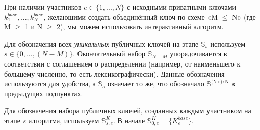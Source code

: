 При наличии участников $e \in \{1,...,N\}$ с исходными приватными ключами $k^{base}_1,...,k^{base}_N$, желающими создать объединённый ключ по схеме «M $\leq$ N» (где M $\geq$ 1 и N $\geq$ 2), мы можем использовать интерактивный алгоритм.

Для обозначения всех {\em уникальных} публичных ключей на этапе $\mathbb{S}_s$ используем $s \in \{0,...,(N-M)\}$. Окончательный набор $\mathbb{S}_{N-M}$ упорядочивается в соответствии с соглашением о распреде\-лении (например, от наименьшего к большему численно, то есть лексикографически). Данные обозначения используются для удобства, а $\mathbb{S}_s$ означает то же, что обозначало $\mathbb{S}^{\textrm{(N-s)xN}}$ в предыдущих подпунктах.

Для обозначения набора публичных ключей, созданных каждым участником на этапе $s$ алгоритма, используем $\mathbb{S}^K_{s,e}$. В начале $\mathbb{S}^K_{0,e} = \{K^{base}_e\}$.


